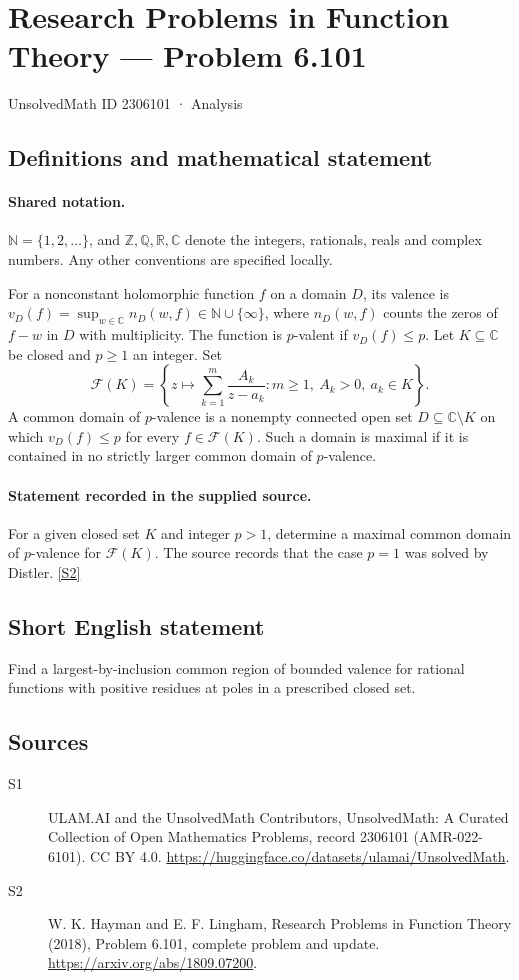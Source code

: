 \documentclass[11pt]{article}
\newcommand{\sref}[2]{\hyperlink{source:#1:#2}{[S#2]}}
\begin{document}
\setcounter{section}{2306100}
\section{Research Problems in Function Theory — Problem 6.101}\label{2306101}
{\small\sffamily UnsolvedMath ID 2306101 · Analysis}
\subsection{Definitions and mathematical statement}

\paragraph{Shared notation.}$\mathbb N=\{1,2,\ldots\}$, and $\mathbb Z,\mathbb Q,\mathbb R,\mathbb C$ denote the integers, rationals, reals and complex numbers. Any other conventions are specified locally.


For a nonconstant holomorphic function $f$ on a domain $D$, its valence is $v_D(f)=\sup_{w\in\mathbb C}n_D(w,f)\in\mathbb N\cup\{\infty\}$, where $n_D(w,f)$ counts the zeros of $f-w$ in $D$ with multiplicity. The function is $p$-valent if $v_D(f)\leq p$. Let $K\subseteq\mathbb C$ be closed and $p\geq1$ an integer. Set
\[\mathcal F(K)=\left\{z\longmapsto\sum_{k=1}^{m}\frac{A_k}{z-a_k}:m\geq1,\ A_k>0,\ a_k\in K\right\}.\]
A common domain of $p$-valence is a nonempty connected open set $D\subseteq\mathbb C\setminus K$ on which $v_D(f)\leq p$ for every $f\in\mathcal F(K)$. Such a domain is maximal if it is contained in no strictly larger common domain of $p$-valence.
\paragraph{Statement recorded in the supplied source.}
For a given closed set $K$ and integer $p>1$, determine a maximal common domain of $p$-valence for $\mathcal F(K)$. The source records that the case $p=1$ was solved by Distler. \sref{2306101}{2}
\subsection{Short English statement}
Find a largest-by-inclusion common region of bounded valence for rational functions with positive residues at poles in a prescribed closed set.
\subsection{Sources}
\begin{description}
\item[\hypertarget{source:2306101:1}{S1}] ULAM.AI and the UnsolvedMath Contributors, UnsolvedMath: A Curated Collection of Open Mathematics Problems, record 2306101 (AMR-022-6101). CC BY 4.0. \url{https://huggingface.co/datasets/ulamai/UnsolvedMath}.
\item[\hypertarget{source:2306101:2}{S2}] W. K. Hayman and E. F. Lingham, Research Problems in Function Theory (2018), Problem 6.101, complete problem and update. \url{https://arxiv.org/abs/1809.07200}.
\end{description}
\label{end:2306101}
\end{document}
